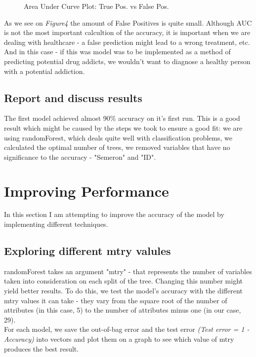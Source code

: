 \documentclass{article}\usepackage[]{graphicx}\usepackage[]{color}
\newenvironment{knitrout}{}{} %
\begin{document}
\begin{itemize}
\begin {figure}[H]
\begin {center}
\begin{knitrout}
\end{knitrout}
\caption {Area Under Curve Plot: True Pos. vs False Pos.}
\label{fig4}
\end {center}
\end {figure}

As we see on \textit{Figure4} the amount of False Positives is quite small. Although AUC is not the most important calcultion of the accuracy, it is important when we are dealing with healthcare - a false prediction might lead to a wrong treatment, etc. And in this case - if this was model was to be implemented as a method of predicting potential drug addicts, we wouldn't want to diagnose a healthy person with a potential addiction.
\\

\subsection{Report and discuss results}
The first model achieved almost 90\% accuracy on it's first run. This is a good result which might be caused by the steps we took to ensure a good fit: we are using randomForest, which deals quite well with classification problems, we calculated the optimal number of trees, we removed variables that have no significance to the accuracy - "Semeron" and "ID".
\\

\section{Improving Performance}
In this section I am attempting to improve the accuracy of the model by implementing different techniques.
\subsection{Exploring different mtry valules}

randomForest takes an argument "mtry" - that represents the number of variables taken into consideration on each split of the tree. Changing this number might yield better results. To do this, we test the model's accuracy with the different mtry values it can take - they vary from the square root of the number of attributes (in this case, 5) to the number of attributes minus one (in our case, 29).\\
For each model, we save the out-of-bag error and the test error \textit{(Test error = 1 - Accuracy)} into vectors and plot them on a graph to see which value of mtry produces the best result.


\end{itemize}
\end{document}
